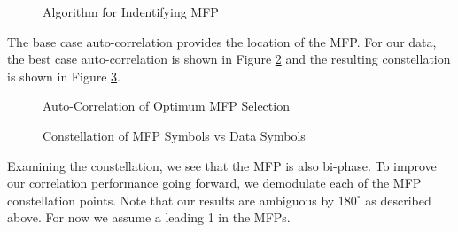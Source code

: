 \documentclass[conference,onecolumn]{IEEEtran}
\begin{document}
\begin{figure}[H]
	\centerline{}
	\caption{Algorithm for Indentifying MFP}
	\label{fig::finding_mfp}
\end{figure}

The base case auto-correlation provides the location of the MFP. For our data, the best case auto-correlation is shown in Figure \ref{fig::mfp_correlation} and the resulting constellation is shown in Figure \ref{fig::mfp_constellation}.

\begin{figure}[H]
	\centerline{}
	\caption{Auto-Correlation of Optimum MFP Selection}
	\label{fig::mfp_correlation}
\end{figure}

\begin{figure}[H]
	\centerline{}
	\caption{Constellation of MFP Symbols vs Data Symbols}
	\label{fig::mfp_constellation}
\end{figure}

Examining the constellation, we see that the MFP is also bi-phase. To 
improve our correlation performance going forward, we demodulate each of the MFP constellation points. Note that our results are ambiguous by $180^{\circ}$ as described above. For now we assume a leading 1 in the MFPs.
\end{document}
